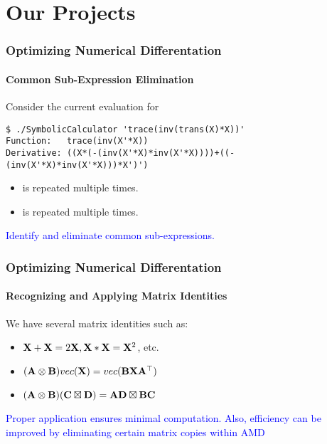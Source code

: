 \section{Our Projects}

\begin{frame}[fragile]
\frametitle{Optimizing Numerical Differentation}
\framesubtitle{Common Sub-Expression Elimination}
%
Consider the current evaluation for 
\textcolor{blue}{}
%
\begin{lstlisting}[style=basic]
$ ./SymbolicCalculator 'trace(inv(trans(X)*X))'
Function:   trace(inv(X'*X))
Derivative: ((X*(-(inv(X'*X)*inv(X'*X))))+((-(inv(X'*X)*inv(X'*X)))*X')')
\end{lstlisting}

\begin{itemize}
\item \textcolor{blue}{} is repeated multiple times.
\item \textcolor{blue}{} is repeated multiple times.
\end{itemize}
%
\begin{center}
\textcolor{blue}{Identify and eliminate common sub-expressions.}
\end{center}
%
\end{frame}

\begin{frame}[fragile]
\frametitle{Optimizing Numerical Differentation}
\framesubtitle{Recognizing and Applying Matrix Identities}
%
We have several matrix identities such as:
%
\begin{itemize}
\item $\mathbf{X}+\mathbf{X} = 2\mathbf{X}, \mathbf{X}*\mathbf{X} = \mathbf{X}^2$, etc.
\item $(\mathbf{A}\otimes{}\mathbf{B})vec(\mathbf{X}) = vec(\mathbf{B}\mathbf{X}\mathbf{A}^\top)$
\item $(\mathbf{A}\otimes{}\mathbf{B})(\mathbf{C}\boxtimes{}\mathbf{D}) = \mathbf{A}\mathbf{D}\boxtimes{}\mathbf{B}\mathbf{C}$
\end{itemize}

%
\begin{center}
\textcolor{blue}{Proper application ensures minimal computation.  Also,
efficiency can be improved by eliminating certain matrix copies within AMD}
\end{center}
%
\end{frame}

